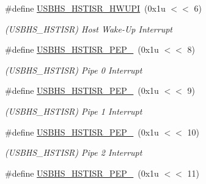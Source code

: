 \begin{DoxyCompactItemize}
\mbox{\label{group__SAME70__USBHS_gafbd5ce141cbeda44deeeb8803154192b}} 
\#define \mbox{\hyperlink{group__SAME70__USBHS_gafbd5ce141cbeda44deeeb8803154192b}{U\+S\+B\+H\+S\+\_\+\+H\+S\+T\+I\+S\+R\+\_\+\+H\+W\+U\+PI}}~(0x1u $<$$<$ 6)
\begin{DoxyCompactList}\small\item\em (U\+S\+B\+H\+S\+\_\+\+H\+S\+T\+I\+SR) Host Wake-\/\+Up Interrupt \end{DoxyCompactList}\item 
\mbox{\label{group__SAME70__USBHS_ga1d551b0793867638a6420df8f4a25645}} 
\#define \mbox{\hyperlink{group__SAME70__USBHS_ga1d551b0793867638a6420df8f4a25645}{U\+S\+B\+H\+S\+\_\+\+H\+S\+T\+I\+S\+R\+\_\+\+P\+E\+P\+\_}}~(0x1u $<$$<$ 8)
\begin{DoxyCompactList}\small\item\em (U\+S\+B\+H\+S\+\_\+\+H\+S\+T\+I\+SR) Pipe 0 Interrupt \end{DoxyCompactList}\item 
\mbox{\label{group__SAME70__USBHS_ga5edb873128c0048654135ac51a4d9b0a}} 
\#define \mbox{\hyperlink{group__SAME70__USBHS_ga5edb873128c0048654135ac51a4d9b0a}{U\+S\+B\+H\+S\+\_\+\+H\+S\+T\+I\+S\+R\+\_\+\+P\+E\+P\+\_}}~(0x1u $<$$<$ 9)
\begin{DoxyCompactList}\small\item\em (U\+S\+B\+H\+S\+\_\+\+H\+S\+T\+I\+SR) Pipe 1 Interrupt \end{DoxyCompactList}\item 
\mbox{\label{group__SAME70__USBHS_ga461b2c6b064c0598a325c453934b9b1a}} 
\#define \mbox{\hyperlink{group__SAME70__USBHS_ga461b2c6b064c0598a325c453934b9b1a}{U\+S\+B\+H\+S\+\_\+\+H\+S\+T\+I\+S\+R\+\_\+\+P\+E\+P\+\_}}~(0x1u $<$$<$ 10)
\begin{DoxyCompactList}\small\item\em (U\+S\+B\+H\+S\+\_\+\+H\+S\+T\+I\+SR) Pipe 2 Interrupt \end{DoxyCompactList}\item 
\mbox{\label{group__SAME70__USBHS_gac98e3e9598d0c0a054482c1ab99b67c3}} 
\#define \mbox{\hyperlink{group__SAME70__USBHS_gac98e3e9598d0c0a054482c1ab99b67c3}{U\+S\+B\+H\+S\+\_\+\+H\+S\+T\+I\+S\+R\+\_\+\+P\+E\+P\+\_}}~(0x1u $<$$<$ 11)
$$
\end{DoxyCompactItemize}
